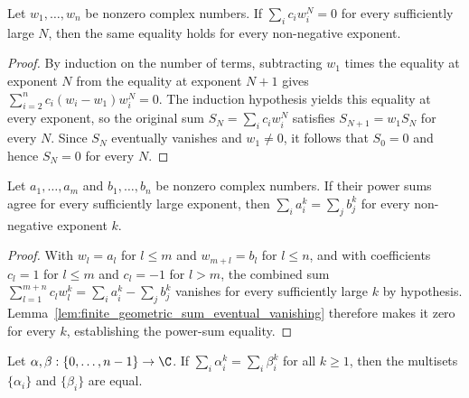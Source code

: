 \begin{lemma}
    \label{lem:finite_geometric_sum_eventual_vanishing}
    \leanok
    Let $w_1,\ldots,w_n$ be nonzero complex numbers. If
    $\sum_i c_i w_i^N=0$ for every sufficiently large $N$, then the same
    equality holds for every non-negative exponent.
\end{lemma}

\begin{proof}\leanok
    By induction on the number of terms, subtracting $w_1$ times the equality at
    exponent $N$ from the equality at exponent $N+1$ gives
    $\sum_{i=2}^{n} c_i(w_i-w_1)w_i^N=0$.
    The induction hypothesis yields this equality at every exponent, so the
    original sum $S_N=\sum_i c_iw_i^N$ satisfies $S_{N+1}=w_1S_N$ for every
    $N$. Since $S_N$ eventually vanishes and $w_1\ne0$, it follows that
    $S_0=0$ and hence $S_N=0$ for every $N$.
\end{proof}

\begin{lemma}
    \label{lem:eventual_power_sum_equality_all_exponents}
    \leanok
    Let $a_1,\ldots,a_m$ and $b_1,\ldots,b_n$ be nonzero complex numbers. If
    their power sums agree for every sufficiently large exponent, then
    $\sum_i a_i^k=\sum_j b_j^k$ for every non-negative exponent $k$.
\end{lemma}

\begin{proof}\leanok
    With $w_l=a_l$ for $l\leq m$ and $w_{m+l}=b_l$ for $l\leq n$, and with
    coefficients $c_l=1$ for $l\leq m$ and $c_l=-1$ for $l>m$, the combined sum
    $\sum_{l=1}^{m+n}c_lw_l^k=\sum_i a_i^k-\sum_j b_j^k$ vanishes for every
    sufficiently large $k$ by hypothesis.
    Lemma~\ref{lem:finite_geometric_sum_eventual_vanishing} therefore makes it
    zero for every $k$, establishing the power-sum equality.
\end{proof}

\begin{lemma}\label{thm:power_sum_multiset}
    \leanok
    Let $\alpha, \beta : \{0, \ldots, n-1\} \to \C$.
    If $\sum_i \alpha_i^k = \sum_i \beta_i^k$ for all $k \ge 1$,
    then the multisets $\{\alpha_i\}$ and $\{\beta_i\}$ are equal.
\end{lemma}

